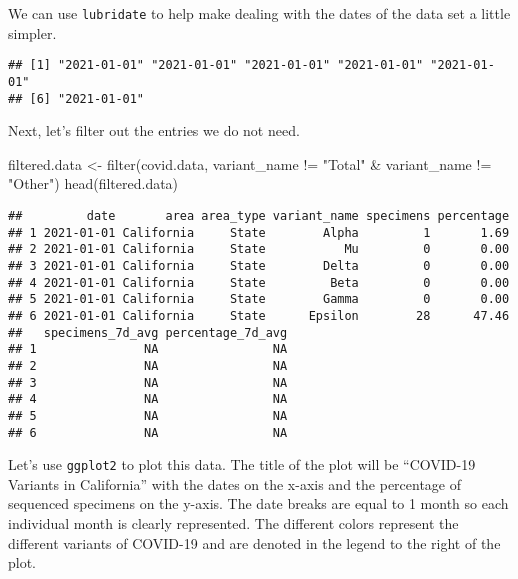 \documentclass[
]{article}
\newenvironment{Shaded}{\begin{snugshade}}{\end{snugshade}}
\newcommand{\FunctionTok}[1]{\textcolor[rgb]{0.00,0.00,0.00}{#1}}
\newcommand{\NormalTok}[1]{#1}
\newcommand{\OtherTok}[1]{\textcolor[rgb]{0.56,0.35,0.01}{#1}}
\newcommand{\SpecialCharTok}[1]{\textcolor[rgb]{0.00,0.00,0.00}{#1}}
\newcommand{\StringTok}[1]{\textcolor[rgb]{0.31,0.60,0.02}{#1}}
\begin{document}
We can use \texttt{lubridate} to help make dealing with the dates of the
data set a little simpler.

\begin{Shaded}
\end{Shaded}

\begin{verbatim}
## [1] "2021-01-01" "2021-01-01" "2021-01-01" "2021-01-01" "2021-01-01"
## [6] "2021-01-01"
\end{verbatim}

Next, let's filter out the entries we do not need.

\begin{Shaded}
\begin{Highlighting}[]
\NormalTok{filtered.data }\OtherTok{\textless{}{-}} \FunctionTok{filter}\NormalTok{(covid.data, variant\_name }\SpecialCharTok{!=} \StringTok{"Total"} \SpecialCharTok{\&}\NormalTok{ variant\_name }\SpecialCharTok{!=} \StringTok{"Other"}\NormalTok{)}
\FunctionTok{head}\NormalTok{(filtered.data)}
\end{Highlighting}
\end{Shaded}

\begin{verbatim}
##         date       area area_type variant_name specimens percentage
## 1 2021-01-01 California     State        Alpha         1       1.69
## 2 2021-01-01 California     State           Mu         0       0.00
## 3 2021-01-01 California     State        Delta         0       0.00
## 4 2021-01-01 California     State         Beta         0       0.00
## 5 2021-01-01 California     State        Gamma         0       0.00
## 6 2021-01-01 California     State      Epsilon        28      47.46
##   specimens_7d_avg percentage_7d_avg
## 1               NA                NA
## 2               NA                NA
## 3               NA                NA
## 4               NA                NA
## 5               NA                NA
## 6               NA                NA
\end{verbatim}

Let's use \texttt{ggplot2} to plot this data. The title of the plot will
be ``COVID-19 Variants in California'' with the dates on the x-axis and
the percentage of sequenced specimens on the y-axis. The date breaks are
equal to 1 month so each individual month is clearly represented. The
different colors represent the different variants of COVID-19 and are
denoted in the legend to the right of the plot.
\end{document}
